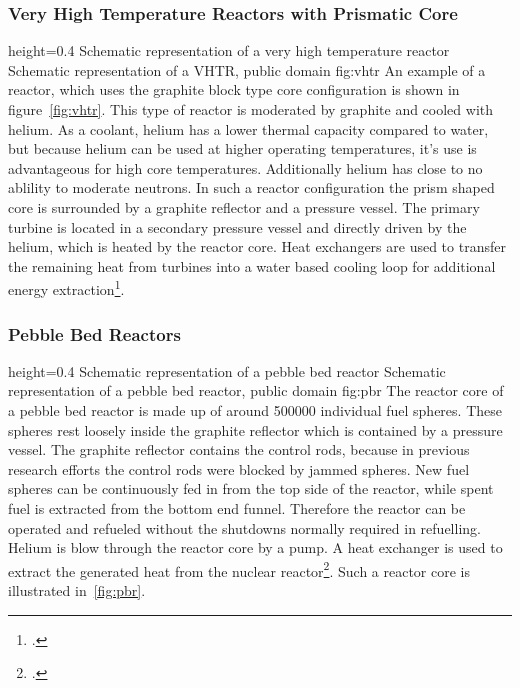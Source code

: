 \subsubsection{Very High Temperature Reactors with Prismatic Core}
    {height=0.4\textheight}
    {Schematic representation of a very high temperature reactor}
    {Schematic representation of a VHTR, public domain}
    {fig:vhtr}
An example of a reactor, which uses the graphite block type core configuration is shown in figure~\ref{fig:vhtr}.
This type of reactor is moderated by graphite and cooled with helium. As a coolant, helium has
a lower thermal capacity compared to water, but because helium can be used at higher operating
temperatures, it's use is advantageous for high core temperatures. Additionally helium has close
to no ablility to moderate neutrons. In such a reactor configuration
the prism shaped core is surrounded by a graphite reflector and a pressure vessel. The primary turbine
is located in a secondary pressure vessel and directly driven by the helium, which is heated by the
reactor core. Heat exchangers are used to transfer the remaining heat from turbines into a water based
cooling loop for additional energy extraction\footcite{VHTRTS}.
\subsubsection{Pebble Bed Reactors}
    {height=0.4\textheight}
    {Schematic representation of a pebble bed reactor}
    {Schematic representation of a pebble bed reactor, public domain}
    {fig:pbr}
The reactor core of a pebble bed reactor is made up of around 500000 individual fuel spheres. These
spheres rest loosely inside the graphite reflector which is contained by a pressure vessel. The graphite
reflector contains the control rods, because in previous research efforts the control rods were blocked
by jammed spheres. New fuel spheres can be continuously fed in from the top side of the reactor, while
spent fuel is extracted from the bottom end funnel. Therefore the reactor can be operated and refueled
without the shutdowns normally required in refuelling. Helium is blow through the reactor core by a
pump. A heat exchanger is used to extract the generated heat from the nuclear reactor\footcite[60-62]{T4Gen}.
Such a reactor core is illustrated in~\ref{fig:pbr}.
